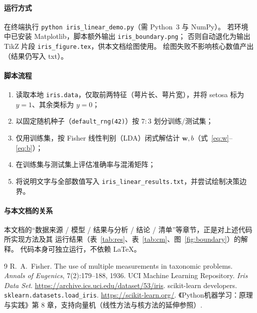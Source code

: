 \documentclass[UTF8, 11pt]{ctexart}
\begin{document}
\paragraph{运行方式}
在终端执行 \verb|python iris_linear_demo.py|（需 Python~3 与 NumPy）。
若环境中已安装 Matplotlib，脚本额外输出 \texttt{iris\_boundary.png}；
否则自动退化为输出 TikZ 片段 \texttt{iris\_figure.tex}，供本文档绘图使用。
绘图失败不影响核心数值产出（结果仍写入 txt）。

\paragraph{脚本流程}
\begin{enumerate}
  \item 读取本地 \texttt{iris.data}，仅取前两特征（萼片长、萼片宽），并将 setosa 标为 $y=1$、其余类标为 $y=0$；
  \item 以固定随机种子（\verb|default_rng(42)|）按 $7:3$ 划分训练/测试集；
  \item 仅用训练集，按 Fisher 线性判别（LDA）闭式解估计 $\mathbf{w}, b$（式~\eqref{eq:w}--\eqref{eq:b}）；
  \item 在训练集与测试集上评估准确率与混淆矩阵；
  \item 将说明文字与全部数值写入 \texttt{iris\_linear\_results.txt}，并尝试绘制决策边界。
\end{enumerate}

\paragraph{与本文档的关系}
本文档的“数据来源 / 模型 / 结果与分析 / 结论 / 清单”等章节，正是对上述代码所实现方法及其
运行结果（表~\ref{tab:res}、表~\ref{tab:cm}、图~\ref{fig:boundary}）的解释。
代码本身可独立运行，不依赖 LaTeX。

\begin{thebibliography}{9}
 R.~A.~Fisher. The use of multiple measurements in taxonomic
  problems. \emph{Annals of Eugenics}, 7(2):179--188, 1936.
 UCI Machine Learning Repository. \emph{Iris Data Set}.
  \url{https://archive.ics.uci.edu/dataset/53/iris}.
 scikit-learn developers. \verb|sklearn.datasets.load_iris|.
  \url{https://scikit-learn.org/}.
 《Python机器学习：原理与实践》第 8 章，支持向量机（线性方法与核方法的延伸参照）.
\end{thebibliography}
\end{document}
